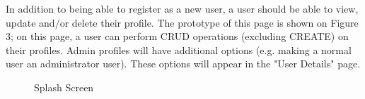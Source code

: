 \documentclass{article}
\begin{document}
			In addition to being able to register as a new user, a user should be able to view, update and/or delete their profile. The prototype of this page is shown on Figure 3; on this page, a user can perform CRUD operations (excluding CREATE) on their profiles. Admin profiles will have additional options (e.g. making a normal user an administrator user). These options will appear in the "User Details" page.
\begin{figure}[H]
	\caption{Splash Screen}
	\endminipage\hfill

\end{figure}
\end{document}
